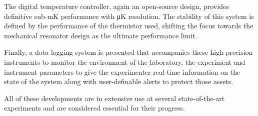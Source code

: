 The digital temperature controller, again an open-source design, provides definitive sub-\unit{\milli\kelvin} performance with \unit{\micro\kelvin} resolution. The stability of this system is defined by the performance of the thermistor used, shifting the focus towards the mechanical resonator design as the ultimate performance limit.

Finally, a data logging system is presented that accompanies these high precision instruments to monitor the environment of the laboratory, the experiment and instrument parameters to give the experimenter real-time information on the state of the system along with user-definable alerts to protect those assets.

All of these developments are in extensive use at several state-of-the-art experiments and are considered essential for their progress.

